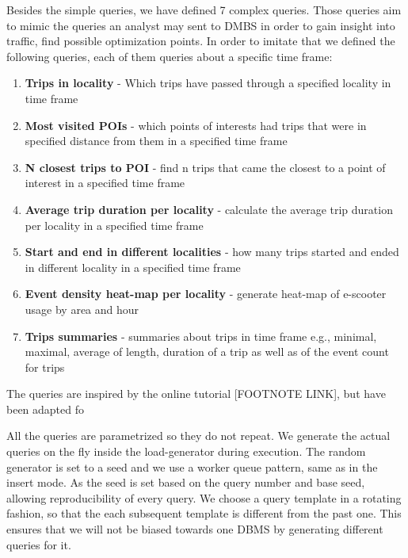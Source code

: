 Besides the simple queries, we have defined 7 complex queries.
Those queries aim to mimic the queries an analyst may sent to DMBS in order to gain insight into traffic, find possible optimization points.
In order to imitate that we defined the following queries, each of them queries about a specific time frame:
\begin{enumerate}
	\item \textbf{Trips in locality} - Which trips have passed through a specified locality in time frame
	\item \textbf{Most visited POIs} - which points of interests had trips that were in specified distance from them in a specified time frame
	\item \textbf{N closest trips to POI} - find n trips that came the closest to a point of interest in a specified time frame
	\item \textbf{Average trip duration per locality} - calculate the average trip duration per locality in a specified time frame
	\item \textbf{Start and end in different localities} - how many trips started and ended in different locality in a specified time frame
	\item \textbf{Event density heat-map per locality} - generate heat-map of e-scooter usage by area and hour
	\item \textbf{Trips summaries} - summaries about trips in time frame e.g., minimal, maximal, average of length, duration of a trip as well as of the event count for trips
\end{enumerate}

The queries are inspired by the online tutorial [FOOTNOTE LINK], but have been adapted fo

All the queries are parametrized so they do not repeat.
We generate the actual queries on the fly inside the load-generator during execution. 
The random generator is set to a seed and we use a worker queue pattern, same as in the insert mode.
As the seed is set based on the query number and base seed, allowing reproducibility of every query.
We choose a query template in a rotating fashion, so that the each subsequent template is different from the past one.
This ensures that we will not be biased towards one DBMS by generating different queries for it.


